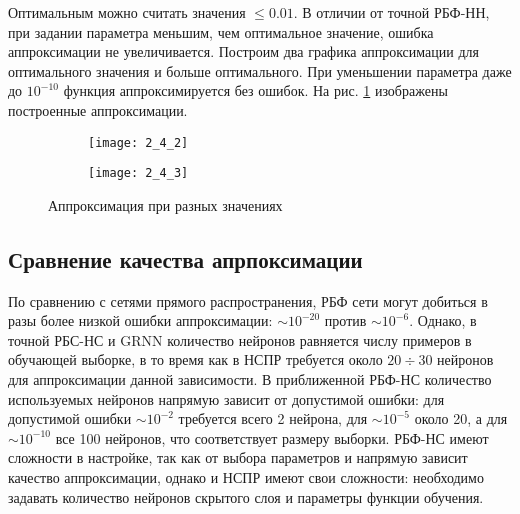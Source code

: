 Оптимальным можно считать значения  $\leq 0.01$. В отличии от точной РБФ-НН, при задании параметра  меньшим, чем оптимальное значение, ошибка аппроксимации не увеличивается. Построим два графика аппроксимации для оптимального значения  и больше оптимального. При уменьшении параметра даже до $10^{-10}$ функция аппроксимируется без ошибок. На рис. \ref{fig:2_4_2} изображены построенные аппроксимации.
\begin{figure}[H]
\begin{center}
	\begin{subfigure}{0.49\textwidth}
		\texttt{[image: 2\_4\_2]}
		\caption{}
	\end{subfigure}
	\begin{subfigure}{0.49\textwidth}
		\texttt{[image: 2\_4\_3]}
		\caption{}
	\end{subfigure}
	\caption{Аппроксимация при разных значениях }
	\label{fig:2_4_2}
\end{center}
\end{figure}

\subsection{Сравнение качества апрпоксимации}


По сравнению с сетями прямого распространения, РБФ сети могут добиться в разы более низкой ошибки аппроксимации: $\sim 10^{-20}$ против $\sim 10^{-6}$. Однако, в точной РБС-НС и GRNN количество нейронов равняется числу примеров в обучающей выборке, в то время как в НСПР требуется около $20 \div 30$ нейронов для аппроксимации данной зависимости. В приближенной РБФ-НС количество используемых нейронов напрямую зависит от допустимой ошибки: для допустимой ошибки $\sim 10^{-2}$ требуется всего 2 нейрона, для $\sim 10^{-5}$ около 20, а для $\sim 10^{-10}$ все 100 нейронов, что соответствует размеру выборки. РБФ-НС имеют сложности в настройке, так как от выбора параметров  и  напрямую зависит качество аппроксимации, однако и НСПР имеют свои сложности:  необходимо задавать количество нейронов скрытого слоя и параметры функции обучения.

